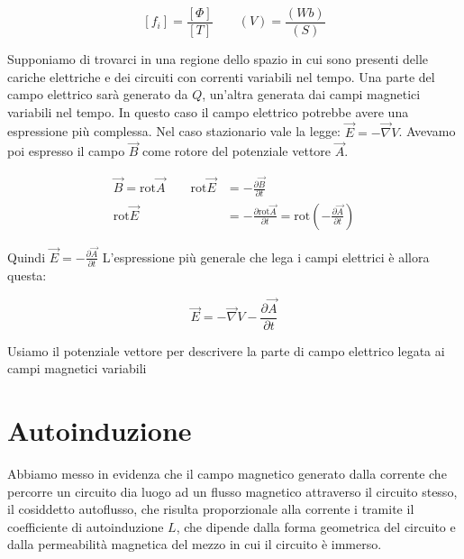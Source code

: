 \[
	[f_i] = \frac{[\Phi ]}{[T]} \qquad (V)=\frac{(Wb)}{(S)}
\]

Supponiamo di trovarci in una regione dello spazio in cui sono presenti delle cariche elettriche e dei circuiti con correnti variabili nel tempo. Una parte del campo elettrico sarà generato da $Q$, un'altra generata dai campi magnetici variabili nel tempo. In questo caso il campo elettrico potrebbe avere una espressione più complessa.
Nel caso stazionario vale la legge: $ \vec{E} = -\vec{\nabla} V $.
Avevamo poi espresso il campo $\vec{B}$ come rotore del potenziale vettore $\vec{A}$.

\begin{equation*}
	\begin{aligned}
		\vec{B} =\text{rot}\vec{A} \qquad \text{rot}\vec{E} &= - \frac{\partial \vec{B}}{\partial t} \\
		\text{rot}\vec{E} &= - \frac{\partial \text{rot}\vec{A}}{\partial t} = \text{rot}\left(-\frac{\partial \vec{A}}{\partial t} \right)
	\end{aligned}
\end{equation*}

Quindi $ \vec{E} = - \frac{\partial \vec{A}}{\partial t}  $
L'espressione più generale che lega i campi elettrici è allora questa:

\[
	\boxed{\vec{E} = - \vec{\nabla} V - \frac{\partial \vec{A}}{\partial t}}
\]

Usiamo il potenziale vettore per descrivere la parte di campo elettrico legata ai campi magnetici variabili

\section{Autoinduzione}

Abbiamo messo in evidenza che il campo magnetico generato dalla corrente che percorre un circuito dia luogo ad un flusso magnetico attraverso il circuito stesso, il cosiddetto autoflusso, che risulta proporzionale alla corrente i tramite il coefficiente di autoinduzione $L$, che dipende dalla forma geometrica del circuito e dalla permeabilità magnetica del mezzo in cui il circuito è immerso.

